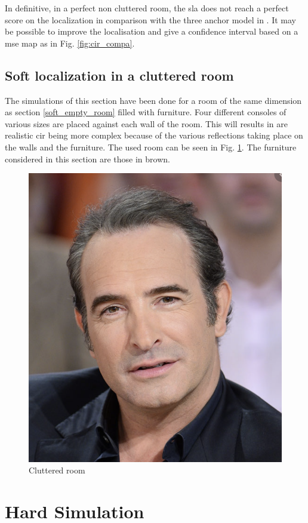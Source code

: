 In definitive, in a perfect non cluttered room, the \gls{sla} does not reach a perfect score on the localization in comparison with the three anchor model in \cite{hannotier2019indoor}. It may be possible to improve the localisation and give a confidence interval based on a \gls{mse} map as in Fig. \ref{fig:cir_compa}.

\subsection{Soft localization in a cluttered room}

The simulations of this section have been done for a room of the same dimension as section \ref{soft_empty_room} filled with furniture. Four different consoles of various sizes are placed against each wall of the room. This will results in are realistic \gls{cir} being more complex because of the various reflections taking place on the walls and the furniture. The used room can be seen in Fig. \ref{fig:room_cluttered}. The furniture considered in this section are those in brown.

\begin{figure}
\centering
\includegraphics[width=.2\linewidth]{Images/Temporary_pic.png}
\caption{Cluttered room \label{fig:room_cluttered}}
\end{figure}




\section{Hard Simulation}


